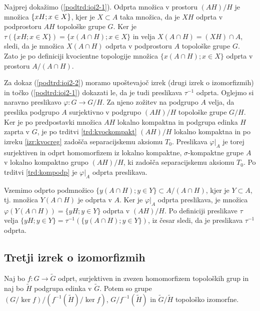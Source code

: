 \documentclass[mat1]{fmfdelo}
\begin{document}
\begin{dokaz}
Najprej dokažimo (\ref{podtrd:ioi2-1}).
Odprta množica v prostoru $(AH)/H$ je množica $\lbrace xH ; \break x\in X \rbrace$, kjer je $X \subset A$ taka množica, da je $XH$ odprta v podprostoru $AH$ topološke grupe $G$. Ker je $\tau(\lbrace xH ; x \in X \rbrace) = \lbrace x(A \cap H) ; x \in X \rbrace$ in velja $X(A \cap H) = (XH)\cap A$, sledi, da je množica $X(A \cap H)$ odprta v podprostoru $A$ topološke grupe $G$. Zato je po definiciji kvocientne topologije množica $\lbrace x(A\cap H) ; x \in X \rbrace$ odprta v prostoru $A/(A \cap H)$.

Za dokaz (\ref{podtrd:ioi2-2}) moramo upoštevajoč izrek (drugi izrek o izomorfizmih) in točko (\ref{podtrd:ioi2-1}) dokazati le, da je tudi preslikava $\tau^{-1}$ odprta.
Oglejmo si naravno preslikavo $\varphi\colon G \to G/H$. Za njeno zožitev na podgrupo $A$ velja, da preslika podgrupo $A$ surjektivno v podgrupo $(AH)/H$ topološke grupe $G/H$. Ker je po predpostavki množica $AH$ lokalno kompaktna in podgrupa edinka $H$ zaprta v $G$, je po trditvi \ref{trd:kvockompakt} $(AH)/H$ lokalno kompaktna in po izreku \ref{izr:kvocreg} zadošča separacijskemu aksiomu $T_0$. Preslikava $\varphi|_A$ je torej surjektiven in odprt homomorfizem iz lokalno kompaktne, $\sigma$-kompaktne grupe $A$ v lokalno kompaktno grupo $(AH)/H$, ki zadošča separacijskemu aksiomu $T_0$. Po trditvi \ref{trd:kompodp} je $\varphi|_A$ odprta preslikava.

Vzemimo odprto podmnožico $\lbrace y(A \cap H) ; y \in Y \rbrace \subset A/(A \cap H)$, kjer je $Y \subset A$, tj. množica $Y(A \cap H)$ je odprta v $A$. Ker je $\varphi|_A$ odprta preslikava, je množica $\varphi(Y(A \cap H)) = \lbrace yH ; y \in Y \rbrace$ odprta v $(AH)/H$. Po definiciji preslikave $\tau$ velja $\lbrace yH ; y \in Y \rbrace = \tau^{-1}(\lbrace y(A \cap H) ; y \in Y \rbrace)$, iz česar sledi, da je preslikava $\tau^{-1}$ odprta.
\end{dokaz}


\subsection{Tretji izrek o izomorfizmih}
\begin{trditev}\label{trd:predtretji}
	Naj bo $f\colon G \to \widetilde{G}$ odprt, surjektiven in zvezen homomorfizem topoloških grup in naj bo $\widetilde{H}$ podgrupa edinka v $\widetilde{G}$. Potem so grupe $(G/\ker f)/(f^{-1}(\widetilde{H})/\ker f)$, $G/f^{-1}(\widetilde{H})$ in $\widetilde{G}/\widetilde{H}$ topološko izomorfne.
\end{trditev}
\end{document}
